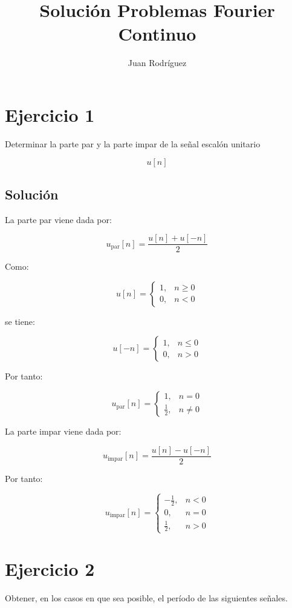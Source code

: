 \documentclass[fleqn]{article}
\title{Solución Problemas Fourier Continuo}
\author{Juan Rodríguez}
\begin{document}
\maketitle
\section{Ejercicio 1}
	Determinar la parte par y la parte impar de la señal escalón unitario

	\[
	u[n]
	\]

	\subsection{Solución}

	La parte par viene dada por:

	\[
	u_{\text{par}}[n]
	=
	\frac{u[n]+u[-n]}{2}
	\]

	Como:

	\[
	u[n]=
	\begin{cases}
	1, & n\geq0 \\[1mm]
	0, & n<0
	\end{cases}
	\]

	se tiene:

	\[
	u[-n]=
	\begin{cases}
	1, & n\leq0 \\[1mm]
	0, & n>0
	\end{cases}
	\]

	Por tanto:

	\[
	\boxed{
	u_{\text{par}}[n]
	=
	\begin{cases}
	1, & n=0 \\[1mm]
	\frac{1}{2}, & n\neq0
	\end{cases}
	}
	\]

	La parte impar viene dada por:

	\[
	u_{\text{impar}}[n]
	=
	\frac{u[n]-u[-n]}{2}
	\]

	Por tanto:

	\[
	\boxed{
	u_{\text{impar}}[n]
	=
	\begin{cases}
	-\frac{1}{2}, & n<0 \\[1mm]
	0, & n=0 \\[1mm]
	\frac{1}{2}, & n>0
	\end{cases}
	}
	\]

\section{Ejercicio 2}
	Obtener, en los casos en que sea posible, el período de las siguientes señales.
\end{document}
